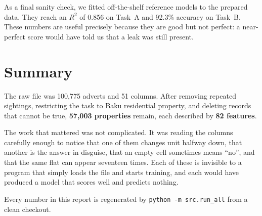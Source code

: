 \documentclass[10pt,twocolumn,a4paper]{article}
\begin{document}
As a final sanity check, we fitted off-the-shelf reference models to the
prepared data. They reach an $R^2$ of 0.856 on Task~A and 92.3\%
accuracy on Task~B. These numbers are useful precisely because they are good but
not perfect: a near-perfect score would have told us that a leak was
still present.

\section{Summary}

The raw file was 100{,}775 adverts and 51 columns. After removing
repeated sightings, restricting the task to Baku residential property,
and deleting records that cannot be true, \textbf{57{,}003 properties}
remain, each described by \textbf{82 features}.

The work that mattered was not complicated. It was reading the columns
carefully enough to notice that one of them changes unit halfway down,
that another is the answer in disguise, that an empty cell sometimes
means ``no'', and that the same flat can appear seventeen times. Each of
these is invisible to a program that simply loads the file and starts
training, and each would have produced a model that scores well and
predicts nothing.

Every number in this report is regenerated by
\texttt{python -m src.run\_all} from a clean checkout.
\end{document}
